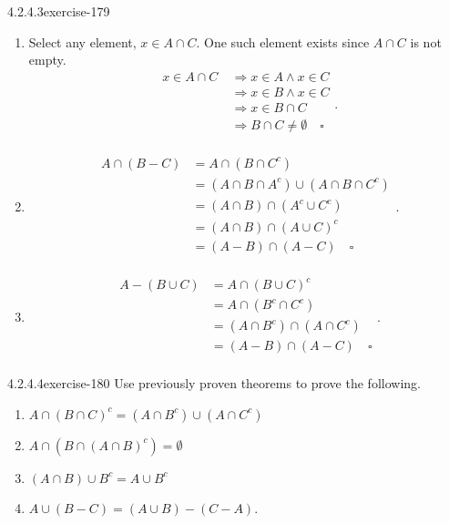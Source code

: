 \documentclass[twoside,10pt,]{book}
\numberwithin{equation}{section}
\begin{document}
\begin{divisionsolution}{4.2.4.3}{}{exercise-179}
\begin{enumerate}[label=(\alph*)]
\begin{equation*}
\end{equation*}
%
\item\hypertarget{li-855}{}\hypertarget{p-1605}{}%
Select any element, \(x \in A\cap C\). One such element exists since \(A\cap C\) is not empty.%
\begin{equation*}
\begin{split}
x\in A\cap C\  &\Rightarrow x\in A \land x\in C \\
& \Rightarrow x\in B \land x\in C \\
& \Rightarrow x\in B\cap C \\
& \Rightarrow B\cap C \neq \emptyset \quad \square \\
\end{split}\text{.}
\end{equation*}
%
\item\hypertarget{li-856}{}\hypertarget{p-1606}{}%
%
\begin{equation*}
\begin{split}
A\cap (B-C) &=A\cap (B\cap C^c) \\
& = (A\cap B\cap A^c)\cup (A\cap B\cap C^c) \\
& =(A\cap B)\cap (A^c\cup C^c) \\
& =(A\cap B)\cap (A\cup C)^c \\
& =(A-B)\cap (A-C) \quad \square\\
\end{split}\text{.}
\end{equation*}
%
\item\hypertarget{li-857}{}\hypertarget{p-1607}{}%
%
\begin{equation*}
\begin{split}
A-(B\cup C)& = A\cap (B\cup C)^c\\
& =A\cap (B^c\cap C^c)\\
& =(A\cap B^c)\cap (A\cap C^c)\\
& =(A-B)\cap (A-C)  \quad \square\\
\end{split}\text{.}
\end{equation*}
%
\end{enumerate}
%
\end{divisionsolution}%
\begin{divisionsolution}{4.2.4.4}{}{exercise-180}%
\hypertarget{p-1608}{}%
Use previously proven theorems to prove the following.%
\par
\hypertarget{p-1609}{}%
\leavevmode%
\begin{enumerate}[label=(\alph*)]
\item\hypertarget{li-858}{}\(A \cap (B\cap C)^c= (A\cap B^c)\cup (A\cap C^{c })\)%
\item\hypertarget{li-859}{}\(A \cap (B\cap (A\cap B)^c)= \emptyset\)%
\item\hypertarget{li-860}{}\((A\cap B) \cup  B^c = A \cup  B^c\)%
\item\hypertarget{li-861}{}\(A \cup  (B - C) = (A \cup  B) - (C - A)\).%
\end{enumerate}
%
\end{divisionsolution}%
\end{document}
